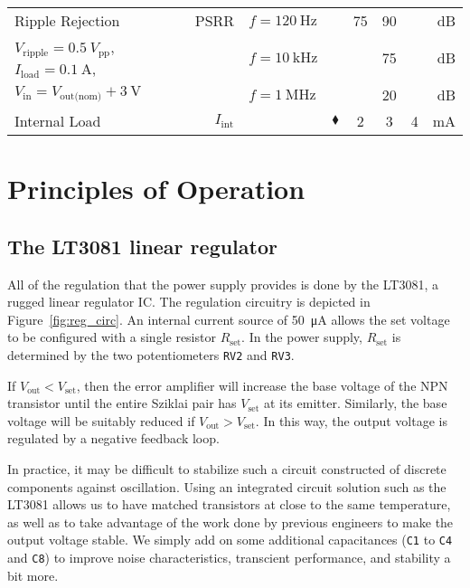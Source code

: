 \documentclass[letterpaper,twocolumn,10pt]{article}
\newcommand{\refdes}[1]{\texttt{#1}}
\newcommand{\wtemp}{\ensuremath{\blacklozenge}}
\begin{document}
\begin{table*}[ht]
{\begin{tabular}{lr|lr|cccr}
      Ripple Rejection
      & PSRR & $f = \SI{120}{\Hz}$ & & 75 & 90 & & \si{\dB} \\

      $V_\text{ripple} = \SI{0.5}{V_{\text{pp}}}$,
      $I_\text{load} = \SI{0.1}{\A}$, &
      & $f = \SI{10}{\kHz}$ & & & 75 & & \si{\dB} \\

      $V_\text{in} = V_\text{out(nom)} + \SI{3}{\V}$ &
      & $f = \SI{1}{\MHz}$ & & & 20 & & \si{\dB} \\

      Internal Load & $I_\text{int}$ & & \wtemp & 2 & 3 & 4 & \si{\mA} \\
      \bottomrule
  \end{tabular}}
  \label{tab:chars}
\end{table*}
\clearpage

\section{Principles of Operation}

\subsection{The LT3081 linear regulator}\label{sec:lt3081}

All of the regulation that the power supply provides is done by the LT3081, a
rugged linear regulator IC. The regulation circuitry is depicted in
Figure~\ref{fig:reg_circ}. An internal current source of \SI{50}{\uA} allows the
set voltage to be configured with a single resistor $R_\text{set}$. In the power
supply, $R_\text{set}$ is determined by the two potentiometers \refdes{RV2} and
\refdes{RV3}.

If $V_\text{out} < V_\text{set}$, then the error amplifier will increase the
base voltage of the NPN transistor until the entire Sziklai pair has
$V_\text{set}$ at its emitter. Similarly, the base voltage will be suitably
reduced if $V_\text{out} > V_\text{set}$. In this way, the output voltage is
regulated by a negative feedback loop.

In practice, it may be difficult to stabilize such a circuit constructed of
discrete components against oscillation. Using an integrated circuit solution
such as the LT3081 allows us to have matched transistors at close to the same
temperature, as well as to take advantage of the work done by previous engineers
to make the output voltage stable. We simply add on some additional capacitances
(\refdes{C1} to \refdes{C4} and \refdes{C8}) to improve noise characteristics,
transcient performance, and stability a bit more.
\end{document}

